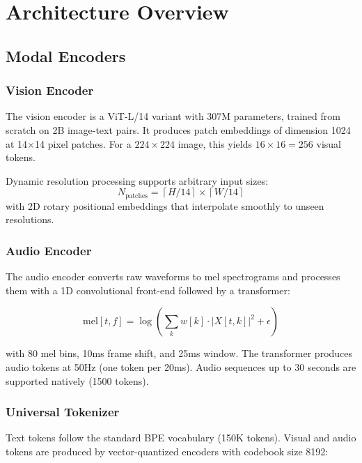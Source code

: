 \documentclass[11pt,a4paper]{article}
\begin{document}
\section{Architecture Overview}

\subsection{Modal Encoders}

\subsubsection{Vision Encoder}

The vision encoder is a ViT-L/14 variant with 307M parameters, trained from scratch
on 2B image-text pairs. It produces patch embeddings of dimension 1024 at
14$\times$14 pixel patches. For a $224\times224$ image, this yields $16\times16=256$
visual tokens.

Dynamic resolution processing supports arbitrary input sizes:
\begin{equation}
N_\text{patches} = \left\lceil H / 14 \right\rceil \times \left\lceil W / 14 \right\rceil
\end{equation}
with 2D rotary positional embeddings that interpolate smoothly to unseen resolutions.

\subsubsection{Audio Encoder}

The audio encoder converts raw waveforms to mel spectrograms and processes them
with a 1D convolutional front-end followed by a transformer:

\begin{equation}
\text{mel}[t, f] = \log\left(\sum_k w[k] \cdot |X[t, k]|^2 + \epsilon\right)
\end{equation}

with 80 mel bins, 10ms frame shift, and 25ms window. The transformer produces
audio tokens at 50Hz (one token per 20ms). Audio sequences up to 30 seconds
are supported natively (1500 tokens).

\subsubsection{Universal Tokenizer}

Text tokens follow the standard BPE vocabulary (150K tokens). Visual and audio
tokens are produced by vector-quantized encoders with codebook size 8192:
\end{document}
